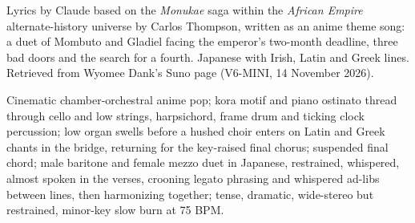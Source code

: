 
\begin{notes}
Lyrics by Claude based on the \emph{Monukae} saga within the \emph{African Empire} alternate-history universe by Carlos Thompson, written as an anime theme song: a duet of Mombuto and Gladiel facing the emperor's two-month deadline, three bad doors and the search for a fourth. Japanese with Irish, Latin and Greek lines. Retrieved from Wyomee Dank's Suno page (V6-MINI, 14 November 2026).
\end{notes}
\begin{style}
Cinematic chamber-orchestral anime pop; kora motif and piano ostinato thread through cello and low strings, harpsichord, frame drum and ticking clock percussion; low organ swells before a hushed choir enters on Latin and Greek chants in the bridge, returning for the key-raised final chorus; suspended final chord; male baritone and female mezzo duet in Japanese, restrained, whispered, almost spoken in the verses, crooning legato phrasing and whispered ad-libs between lines, then harmonizing together; tense, dramatic, wide-stereo but restrained, minor-key slow burn at 75 BPM.
\end{style}
